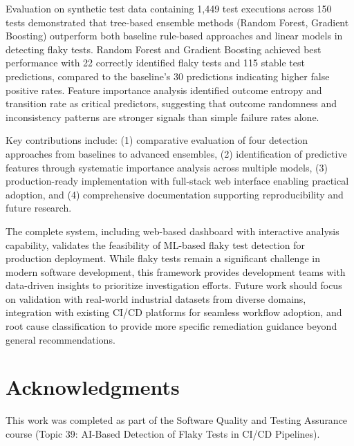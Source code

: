 \documentclass[conference]{IEEEtran}
\begin{document}
Evaluation on synthetic test data containing 1,449 test executions across 150 tests demonstrated that tree-based ensemble methods (Random Forest, Gradient Boosting) outperform both baseline rule-based approaches and linear models in detecting flaky tests. Random Forest and Gradient Boosting achieved best performance with 22 correctly identified flaky tests and 115 stable test predictions, compared to the baseline's 30 predictions indicating higher false positive rates. Feature importance analysis identified outcome entropy and transition rate as critical predictors, suggesting that outcome randomness and inconsistency patterns are stronger signals than simple failure rates alone.

Key contributions include: (1) comparative evaluation of four detection approaches from baselines to advanced ensembles, (2) identification of predictive features through systematic importance analysis across multiple models, (3) production-ready implementation with full-stack web interface enabling practical adoption, and (4) comprehensive documentation supporting reproducibility and future research.

The complete system, including web-based dashboard with interactive analysis capability, validates the feasibility of ML-based flaky test detection for production deployment. While flaky tests remain a significant challenge in modern software development, this framework provides development teams with data-driven insights to prioritize investigation efforts. Future work should focus on validation with real-world industrial datasets from diverse domains, integration with existing CI/CD platforms for seamless workflow adoption, and root cause classification to provide more specific remediation guidance beyond general recommendations.

\section*{Acknowledgments}
This work was completed as part of the Software Quality and Testing Assurance course (Topic 39: AI-Based Detection of Flaky Tests in CI/CD Pipelines).
\end{document}
